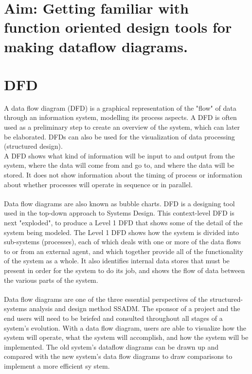 \section*{\fontsize{16}{14}\selectfont Aim: Getting familiar with function oriented design tools for making dataflow diagrams.}

\section*{DFD}
A data flow diagram (DFD) is a graphical representation of the "flow" of data through an information system, modelling its process aspects. A DFD is often used as a preliminary step to create an overview of the system, which can later be elaborated. DFDs can also be used for
the visualization of data processing (structured design).\\
A DFD shows what kind of information will be input to and output from the system, where the data will come from and go to, and where the data will be stored. It does not show information about the timing of process or information about whether processes will operate in sequence or in parallel.\\\\
Data flow diagrams are also known as bubble charts. DFD is a designing tool used in the top-down approach to Systems Design. This context-level DFD is next "exploded", to produce a Level 1 DFD that shows some of the detail of the system being modeled. The Level 1 DFD
shows how the system is divided into sub-systems (processes), each of which deals with one or more of the data flows to or from an external agent, and which together provide all of the functionality of the system as a whole. It also identifies internal data stores that must be present in order for the system to do its job, and shows the flow of data between the various parts of the system.\\\\
Data flow diagrams are one of the three essential perspectives of the structured-systems analysis and design method SSADM. The sponsor of a project and the end users will need to be briefed and consulted throughout all stages of a system's evolution. With a data flow diagram, users are able to visualize how the system will operate, what the system will accomplish, and how the system will be implemented. The old system's dataflow diagrams can be drawn up and compared with the new system's data flow diagrams to draw comparisons to implement a more efficient sy
stem. \\\\
